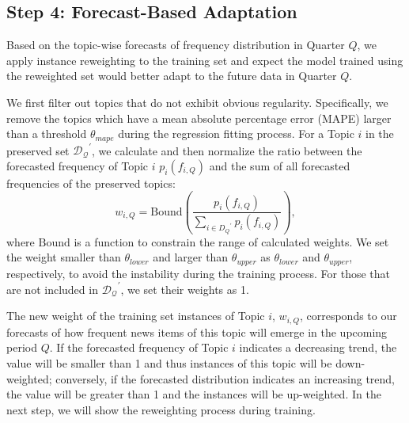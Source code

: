 \documentclass[11pt]{article}
\begin{document}
\subsection{Step 4: Forecast-Based Adaptation}
Based on the topic-wise forecasts of frequency distribution in Quarter $Q$, we apply instance reweighting to the training set and expect the model trained using the reweighted set would better adapt to the future data in Quarter $Q$.

We first filter out topics that do not exhibit obvious regularity. Specifically, we remove the topics which have a mean absolute percentage error (MAPE) larger than a threshold $\theta_{mape}$ during the regression fitting process.
For a Topic $i$ in the preserved set $\mathcal{D_Q}^\prime$, we calculate and then normalize the ratio between the forecasted frequency of Topic $i$ $p_i(f_{i,Q})$ and the sum of all forecasted frequencies of the preserved topics:
\begin{equation}
    w_{i,Q} = \mathrm{Bound}\left(\frac{p_i(f_{i,Q})}{\sum_{i \in {D_Q}^\prime} p_i(f_{i,Q})}\right),
\end{equation}
where $\mathrm{Bound}$ is a function to constrain the range of calculated weights. We set the weight smaller than $\theta_{lower}$ and larger than $\theta_{upper}$ as $\theta_{lower}$ and $\theta_{upper}$, respectively, to avoid the instability during the training process. For those that are not included in $\mathcal{D_Q}^\prime$, we set their weights as 1.

The new weight of the training set instances of Topic $i$, $w_{i,Q}$, corresponds to our forecasts of how frequent news items of this topic will emerge in the upcoming period $Q$.
If the forecasted frequency of Topic $i$ indicates a decreasing trend, the value will be smaller than 1 and thus instances of this topic will be down-weighted; conversely, if the forecasted distribution indicates an increasing trend, the value will be greater than 1 and the instances will be up-weighted. In the next step, we will show the reweighting process during training.
\end{document}

